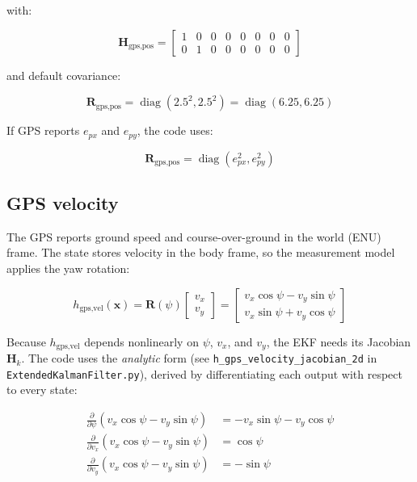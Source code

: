 \documentclass[11pt]{article}
\newcommand{\vect}[1]{\boldsymbol{#1}}
\newcommand{\mat}[1]{\mathbf{#1}}
\newcommand{\diag}{\operatorname{diag}}
\begin{document}
with:

\begin{equation}
\mat{H}_{\text{gps,pos}} =
\begin{bmatrix}
1 & 0 & 0 & 0 & 0 & 0 & 0 & 0 \\
0 & 1 & 0 & 0 & 0 & 0 & 0 & 0
\end{bmatrix}
\end{equation}

and default covariance:

\begin{equation}
\mat{R}_{\text{gps,pos}} = \diag(2.5^2, 2.5^2) = \diag(6.25, 6.25)
\end{equation}

If GPS reports $e_{px}$ and $e_{py}$, the code uses:

\begin{equation}
\mat{R}_{\text{gps,pos}} = \diag(e_{px}^2, e_{py}^2)
\end{equation}

\subsection{GPS velocity}

The GPS reports ground speed and course-over-ground in the world (ENU) frame.
The state stores velocity in the body frame, so the measurement model applies
the yaw rotation:

\begin{equation}
h_{\text{gps,vel}}(\vect{x}) =
\mat{R}(\psi)
\begin{bmatrix}
v_x \\ v_y
\end{bmatrix}
=
\begin{bmatrix}
v_x\cos\psi - v_y\sin\psi \\
v_x\sin\psi + v_y\cos\psi
\end{bmatrix}
\end{equation}

Because $h_{\text{gps,vel}}$ depends nonlinearly on $\psi$, $v_x$, and $v_y$,
the EKF needs its Jacobian $\mat{H}_k$.  The code uses the \emph{analytic}
form (see \texttt{h\_gps\_velocity\_jacobian\_2d} in
\texttt{ExtendedKalmanFilter.py}), derived by differentiating each output with
respect to every state:

\begin{align}
\frac{\partial}{\partial\psi}(v_x\cos\psi - v_y\sin\psi) &= -v_x\sin\psi - v_y\cos\psi \\
\frac{\partial}{\partial v_x}(v_x\cos\psi - v_y\sin\psi) &= \cos\psi \\
\frac{\partial}{\partial v_y}(v_x\cos\psi - v_y\sin\psi) &= -\sin\psi
\end{align}
\end{document}
